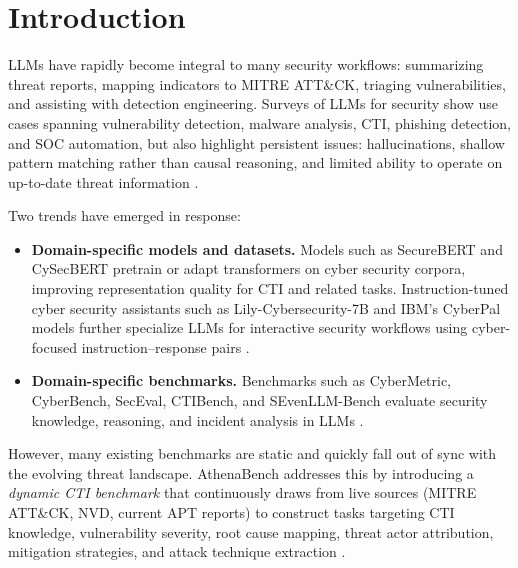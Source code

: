 \documentclass[unnumsec,webpdf,contemporary,large]{oup-authoring-template}
\theoremstyle{thmstyleone}
\theoremstyle{thmstyletwo}
\theoremstyle{thmstylethree}
\begin{document}


\maketitle

\section{Introduction}

LLMs have rapidly become integral to many security workflows: summarizing threat reports, mapping indicators to MITRE ATT\&CK, triaging vulnerabilities, and assisting with detection engineering. Surveys of LLMs for security show use cases spanning vulnerability detection, malware analysis, CTI, phishing detection, and SOC automation, but also highlight persistent issues: hallucinations, shallow pattern matching rather than causal reasoning, and limited ability to operate on up-to-date threat information \cite{levi2024cyberpal,liu2024cyberbench}.

Two trends have emerged in response:

\begin{itemize}
  \item \textbf{Domain-specific models and datasets.} Models such as SecureBERT and CySecBERT pretrain or adapt transformers on cyber security corpora, improving representation quality for CTI and related tasks. Instruction-tuned cyber security assistants such as Lily-Cybersecurity-7B and IBM's CyberPal models further specialize LLMs for interactive security workflows using cyber-focused instruction--response pairs \cite{levi2024cyberpal}.
  \item \textbf{Domain-specific benchmarks.} Benchmarks such as CyberMetric, CyberBench, SecEval, CTIBench, and SEvenLLM-Bench evaluate security knowledge, reasoning, and incident analysis in LLMs \cite{alam2024ctibench,ji2024sevenllm,liu2024cyberbench}.
\end{itemize}

However, many existing benchmarks are static and quickly fall out of sync with the evolving threat landscape. AthenaBench addresses this by introducing a \emph{dynamic CTI benchmark} that continuously draws from live sources (MITRE ATT\&CK, NVD, current APT reports) to construct tasks targeting CTI knowledge, vulnerability severity, root cause mapping, threat actor attribution, mitigation strategies, and attack technique extraction \cite{alam2025athenabench}.
\end{document}
